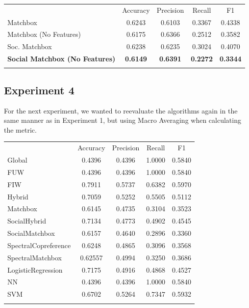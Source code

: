 \begin{table}
\begin{tabular}{ l  c  c  c  c }
\hline\noalign{\smallskip}
 & Accuracy & Precision & Recall & F1 \\
  \noalign{\smallskip}\hline\noalign{\smallskip}
Matchbox & 0.6243 & 0.6103 & 0.3367& 0.4338 \\
Matchbox (No Features) & 0.6175  & 0.6366  & 0.2512& 0.3582 \\

Soc. Matchbox  & 0.6238 & 0.6235  & 0.3024  & 0.4070  \\
{\bf Social Matchbox (No Features)} & {\bf 0.6149} & {\bf 0.6391} & {\bf 0.2272} &  {\bf 0.3344} \\

\noalign{\smallskip}\hline
 \end{tabular} 
\end{table}

\subsection{Experiment 4}
\label{sec:2}

For the next experiment, we wanted to reevaluate the algorithms again in the same manner as in Experiment 1, but using Macro Averaging when calculating the metric.


\begin{table}
\begin{tabular}{ l  c  c  c  c }
\hline\noalign{\smallskip}
 & Accuracy & Precision & Recall & F1 \\
  \noalign{\smallskip}\hline\noalign{\smallskip}
Global &  0.4396 & 0.4396 & 1.0000 & 0.5840 \\
FUW &  0.4396 & 0.4396 & 1.0000 & 0.5840 \\
FIW & 0.7911 & 0.5737 & 0.6382 & 0.5970 \\
Hybrid & 0.7059 & 0.5252 & 0.5505 & 0.5112 \\
Matchbox & 0.6145 &  0.4735 & 0.3104 & 0.3523 \\
SocialHybrid & 0.7134  & 0.4773 & 0.4902 & 0.4545 \\
SocialMatchbox & 0.6157 & 0.4640 & 0.2896 & 0.3360 \\
SpectralCopreference & 0.6248 & 0.4865 & 0.3096 & 0.3568 \\
SpectralMatchbox & 0.62557 &0.4994 & 0.3250 & 0.3686 \\
LogisticRegression & 0.7175 & 0.4916 & 0.4868 & 0.4527 \\
NN & 0.4396 & 0.4396 & 1.0000 & 0.5840 \\

SVM & 0.6702 & 0.5264 & 0.7347 & 0.5932 \\
\noalign{\smallskip}\hline
\end{tabular} 
\end{table}
 

